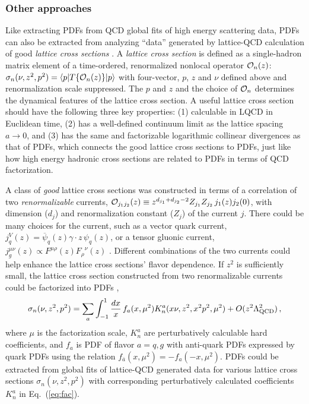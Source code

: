 \subsubsection{Other approaches}
Like extracting PDFs from QCD global fits of high energy scattering data, PDFs can also be extracted from analyzing ``data'' generated by lattice-QCD calculation of good {\it lattice cross sections} \cite{Ma:2014jla,Ma:2014jga}. A {\it lattice cross section} is defined as a single-hadron matrix element of a time-ordered, renormalized nonlocal operator ${\cal O}_n(z)$: ${\sigma}_{n}(\nu,z^2,p^2)=\langle p| {T}\{{\cal O}_n({z})\}|p\rangle$ with four-vector, $p$, $z$ and $\nu$ defined above and renormalization scale suppressed. The $p$ and $z$ and the choice of ${\cal O}_n$ determines the dynamical features of the lattice cross section. A useful lattice cross section should have the following three key properties: (1) calculable in LQCD in Euclidean time, (2) has a well-defined continuum limit as the lattice spacing $a\to 0$, and (3) has the same and factorizable logarithmic collinear divergences as that of PDFs, which connects the good lattice cross sections to PDFs, just like how high energy hadronic cross sections are related to PDFs in terms of QCD factorization.  

A class of {\it good} lattice cross sections was constructed in terms of a correlation of two {\it renormalizable} currents, ${\cal O}_{j_1j_2}(z)\equiv z^{d_{j_1}+d_{j_2}-2} Z_{j_1} Z_{j_2}\, j_1(z) j_2(0)$, with dimension ($d_j$) and renormalization constant ($Z_j$) of the current $j$.  There could be many choices for the current, such as a vector quark current, $j_q^V(z) = \overline{\psi}_q(z)\gamma\cdot{z}\, {\psi}_{q}(z)$, or a tensor gluonic current, $j_g^{\mu\nu}(z)\propto F^{\mu\rho}(z){F_{\rho}}^\nu(z)$ \cite{Ma:2017pxb}.  Different combinations of the two currents could help enhance the lattice cross sections' flavor dependence.  If $z^2$ is sufficiently small, the lattice cross section constructed from two renormalizable currents could be factorized into PDFs \cite{Ma:2017pxb},
\begin{equation}\label{eq:fac}
{\sigma}_{n}(\nu,z^2,p^2)=\sum_{a}\int_{-1}^1 \frac{dx}{x}\, f_{a}(x,\mu^2) 
K_{{n}}^{a}(x\nu,z^2,x^2p^2,\mu^2) +O(z^2\Lambda_{\rm QCD}^2)\, ,
\end{equation}
where $\mu$ is the factorization scale, $K_n^{a}$ are perturbatively calculable hard coefficients, and $f_{a}$ is PDF of flavor $a=q,g$ with anti-quark PDFs expressed by quark PDFs using the relation $f_{\bar{a}}(x,\mu^2)=-f_{{a}}(-x,\mu^2)$.  PDFs could be extracted from global fits of lattice-QCD generated data for various lattice cross sections $\sigma_{n}(\nu,z^2,p^2)$ with corresponding perturbatively calculated coefficients $K_n^{a}$ in Eq.~(\ref{eq:fac}).

